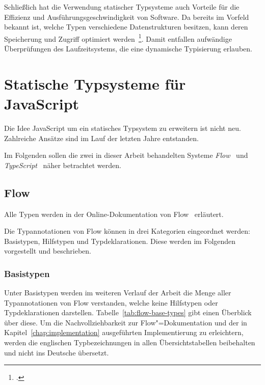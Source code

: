 Schließlich hat die Verwendung statischer Typsysteme auch Vorteile für die Effizienz und Ausführungsgeschwindigkeit von Software. Da bereits im Vorfeld bekannt ist, welche Typen verschiedene Datenstrukturen besitzen, kann deren Speicherung und Zugriff optimiert werden~\footcite[Abschnitt 6.1.3]{MITCHELL:CONCEPTS}. Damit entfallen aufwändige Überprüfungen des Laufzeitsystems, die eine dynamische Typisierung erlauben.


\section{Statische Typsysteme für JavaScript}

Die Idee JavaScript um ein statisches Typsystem zu erweitern ist nicht neu. Zahlreiche Ansätze sind im Lauf der letzten Jahre entstanden.



Im Folgenden sollen die zwei in dieser Arbeit behandelten Systeme \textit{Flow}~\autocite{FLOW:PAPER} und \textit{TypeScript}~\autocite{TYPESCRIPT_SPEC} näher betrachtet werden.

\subsection{Flow}
\label{subsection:flow}

Alle Typen werden in der Online-Dokumentation von Flow~\autocite{FLOW:TYPE_ANNOTATIONS} erläutert.

Die Typannotationen von Flow können in drei Kategorien eingeordnet werden: Basistypen, Hilfstypen und Typdeklarationen. Diese werden im Folgenden vorgestellt und beschrieben.

\subsubsection{Basistypen}
\label{subsection:flow:base-types}

Unter Basistypen werden im weiteren Verlauf der Arbeit die Menge aller Typannotationen von Flow verstanden, welche keine Hilfstypen oder Typdeklarationen darstellen. Tabelle~\ref{tab:flow-base-types} gibt einen Überblick über diese. Um die Nachvollziehbarkeit zur Flow"=Dokumentation und der in Kapitel~\ref{chap:implementation} ausgeführten Implementierung zu erleichtern, werden die englischen Typbezeichnungen in allen Übersichtstabellen beibehalten und nicht ins Deutsche übersetzt.

